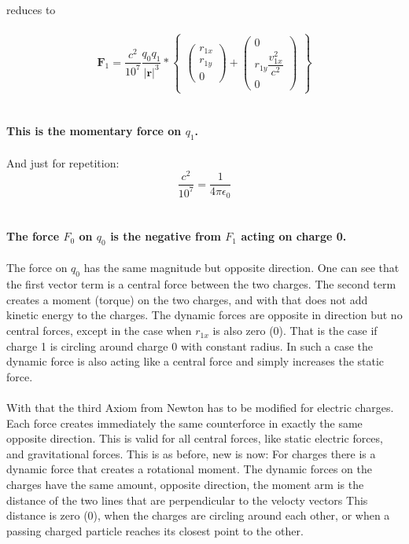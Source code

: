 \documentclass[10pt,titlepage]{article}
\begin{document}
reduces to
\\
\\
\begin{equation}
\textbf{$\textbf{F}_1$}=\frac{c^2}{10^7}\dfrac{q_0q_1}{\vert\textbf{r}\vert^3}*
\begin{Bmatrix}
\begin{pmatrix}r_{1x} \\ r_{1y}\\0\end{pmatrix}+
\begin{pmatrix}0 \\	r_{1y}\dfrac{v_{1x}^2}{c^2} \\0\end{pmatrix}
\end{Bmatrix}
\end{equation}
\\
\\
\textbf{This is the momentary force on $q_1$.}
\\
\\And just for repetition:\
\begin{equation}
\frac{c^2}{10^7}=\frac{1}{4\pi\epsilon_0}
\end{equation}
\\
\\
\textbf{The force  $F_0$  on $q_0$ is the negative from $F_1$ acting on charge 0.}
\\
\\
The force on $  q_0$ has the same magnitude but opposite direction.
One can see that the first vector term is a central force between the two charges.
The second term creates a moment (torque) on the two charges, and with that does not add kinetic energy to the charges. The dynamic forces are opposite in direction but no central forces, except in the case when $r_{1x}$ is also zero (0). That is the case if charge 1 is circling around charge 0 with constant radius. In such a case the dynamic force is also acting like a central force and simply increases the static force.
\\
\\
With that the third Axiom from Newton has to be modified for electric charges. Each force creates immediately the same counterforce in exactly the same opposite direction. This is valid for all central forces, like static electric forces, and gravitational forces. This is as before, new is now:
For charges there is a dynamic force that creates a rotational moment. The dynamic forces on the charges have the same amount, opposite direction, the moment arm is the distance of the two lines that are perpendicular to the velocty vectors This distance is zero (0), when the charges are circling around each other, or when a passing charged particle reaches its closest point to the other. 
\end{document}

